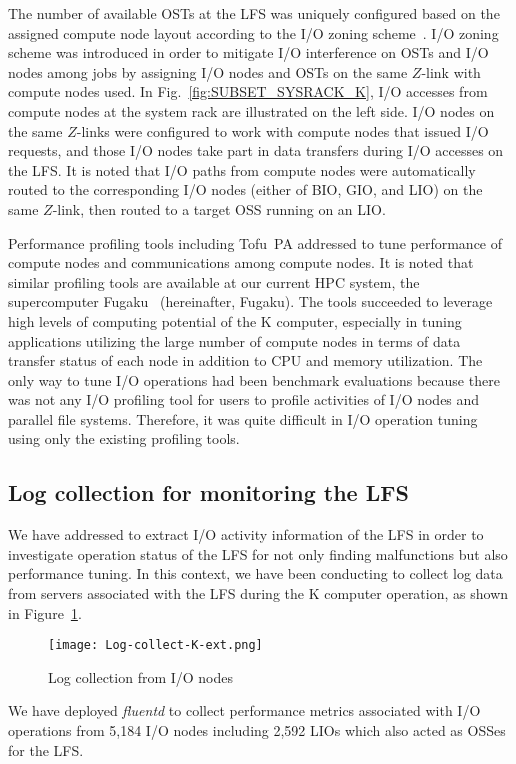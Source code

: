\documentclass{jhps}
\begin{document}
The number of available OSTs at the LFS was uniquely configured
based on the assigned compute node layout according to
the I/O zoning scheme~\cite{sumimoto:LUG2011}.
I/O zoning scheme was introduced in order to mitigate I/O interference on OSTs
and I/O nodes among jobs by assigning I/O nodes and OSTs on the same $Z$-link
with compute nodes used.
In Fig.~\ref{fig:SUBSET_SYSRACK_K}, I/O accesses from compute nodes
at the system rack are illustrated on the left side.
I/O nodes on the same $Z$-links were configured to work with compute nodes
that issued I/O requests, and those I/O nodes
take part in data transfers during I/O accesses on the LFS.
It is noted that I/O paths from compute nodes were automatically routed
to the corresponding I/O nodes (either of BIO, GIO, and LIO) on the same $Z$-link,
then routed to a target OSS running on an LIO.

Performance profiling tools including Tofu~PA addressed to tune performance of
compute nodes and communications among compute nodes.
It is noted that similar profiling tools are available at
our current HPC system, the supercomputer Fugaku~\cite{fugaku_info:web}
(hereinafter, Fugaku).
The tools succeeded to leverage high levels of computing potential of the K computer,
especially in tuning applications utilizing the large number of compute nodes
in terms of data transfer status of each node in addition to CPU and memory utilization.
The only way to tune I/O operations had been benchmark evaluations
because there was not any I/O profiling tool for users to profile activities
of I/O nodes and parallel file systems.
Therefore, it was quite difficult in I/O operation tuning
using only the existing profiling tools.

\subsection{Log collection for monitoring the LFS}
\label{ssec:LOG_COLL_MON}

We have addressed to extract I/O activity information of the LFS
in order to investigate operation status of the LFS
for not only finding malfunctions but also performance tuning.
In this context, we have been conducting to collect log data from servers
associated with the LFS during the K computer operation,
as shown in Figure~\ref{fig:Log-collect-K}.
%
\begin{figure}[tb]
\centering
\texttt{[image: Log-collect-K-ext.png]}
\caption{Log collection from I/O nodes}
\label{fig:Log-collect-K}
\end{figure}
We have deployed {\itshape fluentd} to collect performance metrics associated with
I/O operations from 5,184 I/O nodes including 2,592 LIOs which also acted as OSSes
for the LFS.
\end{document}
